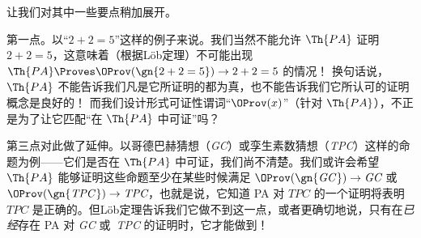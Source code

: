%
%
%
%
%

让我们对其中一些要点稍加展开。

第一点。以“$2+2=5$”这样的例子来说。我们当然不能允许 $\Th{PA}$ 证明 $2+2=5$，这意味着（根据Löb定理）不可能出现 $\Th{PA} \Proves
\OProv(\gn{2+2=5}) \to 2+2=5$ 的情况！{} 换句话说，$\Th{PA}$ 不能告诉我们凡是它所证明的都为真，也不能告诉我们它所认可的证明概念是良好的！{} 而我们设计形式可证性谓词“$\OProv(x)$”（针对 $\Th{PA}$），不正是为了让它匹配“在 $\Th{PA}$ 中可证”吗？

第三点对此做了延伸。以哥德巴赫猜想（\textit{GC\/}）或孪生素数猜想（\textit{TPC\/}）这样的命题为例——它们是否在 $\Th{PA}$ 中可证，我们尚不清楚。我们或许会希望 $\Th{PA}$ 能够证明这些命题至少在某些时候满足 $\OProv(\gn{\textit{GC\/}}) \to \textit{GC}$ 或
$\OProv(\gn{\textit{TPC\/}}) \to \textit{TPC}$，也就是说，它知道 PA 对 $\textit{TPC}$ 的一个证明将表明 $\textit{TPC}$ 是正确的。但Löb定理告诉我们它做不到这一点，或者更确切地说，只有在\emph{已经}存在 PA 对 \textit{GC} 或~\textit{TPC} 的证明时，它才能做到！{}

